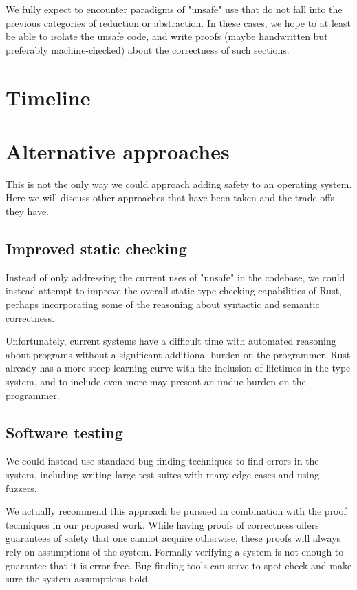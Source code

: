 \documentclass[12pt]{article}
\begin{document}
We fully expect to encounter paradigms of "unsafe" use that do not fall into the previous categories of reduction or abstraction. In these cases, we hope to at least be able to isolate the unsafe code, and write proofs (maybe handwritten but preferably machine-checked) about the correctness of such sections.



\section{Timeline}

\section{Alternative approaches}
This is not the only way we could approach adding safety to an operating system. Here we will discuss other approaches that have been taken and the trade-offs they have.

\subsection{Improved static checking}
Instead of only addressing the current uses of "unsafe" in the codebase, we could instead attempt to improve the overall static type-checking capabilities of Rust, perhaps incorporating some of the reasoning about syntactic and semantic correctness.

Unfortunately, current systems have a difficult time with automated reasoning about programs without a significant additional burden on the programmer. Rust already has a more steep learning curve with the inclusion of lifetimes in the type system, and to include even more may present an undue burden on the programmer.

\subsection{Software testing}
We could instead use standard bug-finding techniques to find errors in the system, including writing large test suites with many edge cases and using fuzzers. 

We actually recommend this approach be pursued in combination with the proof techniques in our proposed work. While having proofs of correctness offers guarantees of safety that one cannot acquire otherwise, these proofs will always rely on assumptions of the system. Formally verifying a system is not enough to guarantee that it is error-free. Bug-finding tools can serve to spot-check and make sure the system assumptions hold.
\end{document}
